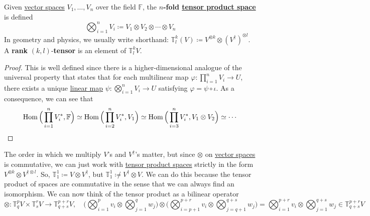	\begin{definition}
	  \label{def:higher-order-tensor-product-spaces}
		Given \hyperref[def:vector-space]{vector spaces} $V_1, \ldots, V_n$ over the field $\mathbb{F}$, the \textbf{$n$-fold \hyperref[def:tensor]{tensor product space}} is defined 
		\begin{equation}
			\bigotimes_{i=1}^{n} V_{i} \coloneqq V_1 \otimes V_2 \otimes \cdots \otimes V_n
		\end{equation}
		In geometry and physics, we usually write shorthand: $\mathbb{T}_l^k (V) \coloneqq V^{\otimes k} \otimes (V^\dagger)^{\otimes l}$. A \textbf{rank} $(k, l)$-\textbf{tensor} is an element of $\mathbb{T}^k_l V$. 
	\end{definition}
	\begin{proof}
	  This is well defined since there is a higher-dimensional analogue of the universal property that states that for each multilinear map $\varphi: \prod_{i=1}^n V_i \to U$, there exists a unique \hyperref[def:linear_map]{linear map} $\psi: \bigotimes_{i=1}^n V_i \to U$ satisfying $\varphi = \psi \circ \iota$. As a consequence, we can see that 
		\begin{equation}
			\operatorname{Hom}\Big( \prod_{i=1}^n V_i^\ast, \mathbb{F} \Big) \simeq \operatorname{Hom}\Big( \prod_{i=2}^n V_i^\ast, V_1 \Big) \simeq \operatorname{Hom}\Big( \prod_{i=3}^n V_i^\ast, V_1 \otimes V_2 \Big) \simeq \cdots
		\end{equation}
	\end{proof}

	The order in which we multiply $V$'s and $V^\dagger$'s matter, but since $\otimes$ on \hyperref[def:vector-space]{vector spaces} is commutative, we can just work with \hyperref[def:tensor]{tensor product spaces} strictly in the form $V^{\otimes k} \otimes V^{\dagger \otimes l}$. So, $\mathbb{T}^{1}_{1} \coloneqq V \otimes V^\dagger$, but $\mathbb{T}^{1}_{1} \not\coloneqq V^\dagger \otimes V$. We can do this because the tensor product of spaces are commutative in the sense that we can always find an isomorphism. We can now think of the tensor product as a bilinear operator
	\begin{equation}
  	\otimes: \mathbb{T}^p_q V \times \mathbb{T}^r_s V \to \mathbb{T}^{p+r}_{q+s} V, \quad \bigg( \bigotimes_{i=1}^p v_i \otimes \bigotimes_{j=1}^q w_j \bigg) \otimes \bigg( \bigotimes_{i = p+1}^{p+r} v_i \otimes \bigotimes_{j=q+1}^{q+s} w_j \bigg) = \bigotimes_{i=1}^{p+r} v_i \otimes \bigotimes_{j=1}^{q+s} w_j \in \mathbb{T}^{p+r}_{q+s} V
	\end{equation}

